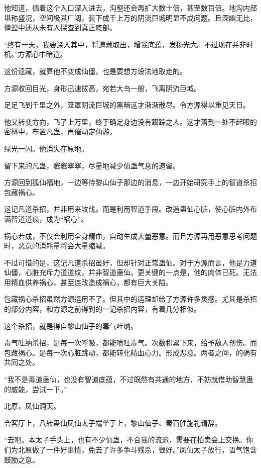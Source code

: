 \begin{this_body}
他知道，循着这个入口深入进去，沟壑还会再扩大数十倍，甚至数百倍。地沟内部堪称盛况，空间极其广阔，装下成千上万的阴流巨城明显不成问题。且深幽无比，僵盟中还从未有人探查到真正底部。

“终有一天，我要深入其中，将遗藏取出，增我底蕴，发扬光大。不过现在并非时机。”方源心中暗道。

这份遗藏，就算他不变成仙僵，也是要想方设法地取走的。

方源收回目光，身形迅速拔高，宛若大鸟一般，飞离阴流巨城。

足足飞到千里之外，笼罩阴流巨城的黑暗这才渐渐散尽。令方源得以重见天日。

他又转变方向，飞了上万里，终于确定身边没有跟踪之人。这才落到一处不起眼的密林中，布置凡蛊，再催动定仙游。

绿光一闪。他消失在原地。

留下来的凡蛊，窸窸窣窣，尽量地减少仙蛊气息的遗留。

方源回到狐仙福地，一边等待黎山仙子那边的消息，一边开始研究手上的智道杀招包藏祸心。

这记凡道杀招，并非用来攻伐。而是利用智道手段。改造蛊仙心脏，使心脏内外布满智道道痕，成为“祸心”。

祸心若成，不仅会利用全身精血，自动生成大量恶意。而且方源再用恶意思考问题时，恶意的消耗量将会大量缩减。

不过可惜的是，这记凡道杀招虽好，但却针对正常蛊仙。对于方源而言，他是力道仙僵，心脏充斥力道道纹，并非智道蛊仙。更关键的一点是，他的肉体已死。无法用精血供养祸心，甚至连改造成祸心，都有巨大关隘。

包藏祸心杀招虽然方源运用不了。但其中的运理却给了方源许多灵感。尤其是杀招的部分内容，和方源之前得到的一记杀招内容，有着几分相似。

这个杀招，就是得自黎山仙子的毒气吐纳。

毒气吐纳杀招，是每一次呼吸，都能喷吐毒气。次数积累下来，给予敌人创伤。而包藏祸心。是每一次心脏跳动，都能转化精血心力。形成恶意。两者之间，的确有共同之处。

“我不是毒道蛊仙，也没有智道底蕴，不过既然有共通的地方，不妨就借助智慧蛊的威能，尝试一下。”

北原，凤仙洞天。

会客厅上，八转蛊仙凤仙太子端坐于上，黎山仙子、秦百胜施礼请辞。

“去吧。本太子手头上，也有不少仙蛊，不合我的流派，需要在拍卖会上交换。你们为北原做了一件好事情，免去了许多争斗残杀，很好。”凤仙太子放行，语气饱含鼓励之意。


\end{this_body}
